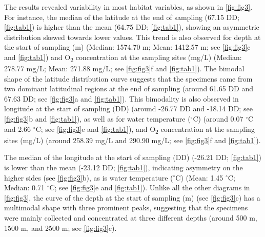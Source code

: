 The results revealed variability in most habitat variables, as shown in \autoref{fig:fig3}. For instance, the median of the latitude at the end of sampling (67.15 DD; \autoref{fig:tab1}) is higher than the mean (64.75 DD; \autoref{fig:tab1}), showing an asymmetric distribution skewed towards lower values. This trend is also observed for depth at the start of sampling (m) (Median: 1574.70 m; Mean: 1412.57 m; see \autoref{fig:fig3}c and \autoref{fig:tab1}) and O\textsubscript{2} concentration at the sampling sites (mg/L) (Median: 278.77 mg/L; Mean: 271.88 mg/L; see \autoref{fig:fig3}f and \autoref{fig:tab1}). The bimodal shape of the latitude distribution curve suggests that the specimens came from two dominant latitudinal regions at the end of sampling (around 61.65 DD and 67.63 DD; see \autoref{fig:fig3}a and \autoref{fig:tab1}). This bimodality is also observed in longitude at the start of sampling (DD) (around -26.77 DD and -18.14 DD; see \autoref{fig:fig3}b and \autoref{fig:tab1}), as well as for water temperature ($^\circ$C) (around 0.07 $^\circ$C and 2.66 $^\circ$C; see \autoref{fig:fig3}e and \autoref{fig:tab1}), and O\textsubscript{2} concentration at the sampling sites (mg/L) (around 258.39 mg/L and 290.90 mg/L; see \autoref{fig:fig3}f and \autoref{fig:tab1}).

The median of the longitude at the start of sampling (DD) (-26.21 DD; \autoref{fig:tab1}) is lower than the mean (-23.12 DD; \autoref{fig:tab1}), indicating asymmetry on the higher sides (see \autoref{fig:fig3}b), as is water temperature ($^\circ$C) (Mean: 1.45 $^\circ$C; Median: 0.71 $^\circ$C; see \autoref{fig:fig3}e and \autoref{fig:tab1}). Unlike all the other diagrams in \autoref{fig:fig3}, the curve of the depth at the start of sampling (m) (see \autoref{fig:fig3}c) has a multimodal shape with three prominent peaks, suggesting that the specimens were mainly collected and concentrated at three different depths (around 500 m, 1500 m, and 2500 m; see \autoref{fig:fig3}c).

